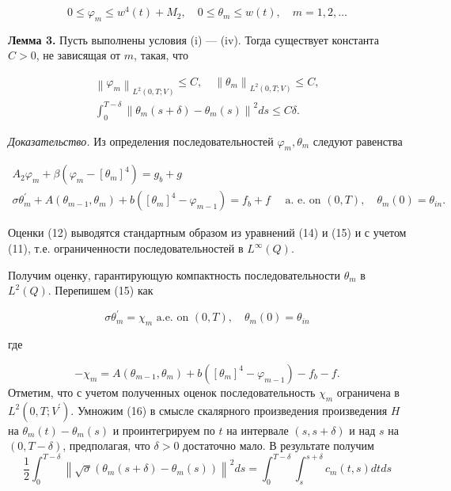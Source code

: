 \[
    0 \leq \varphi_{m} \leq w^{4}(t)+M_{2}, \quad 0 \leq \theta_{m} \leq w(t), \quad m=1,2, \ldots
\]

\textbf{Лемма 3.} Пусть выполнены условия (i) — (iv). Тогда существует константа $C>0$, не зависящая от $m$, такая, что

\[
    \begin{gathered}
        \left\|\varphi_{m}\right\|_{L^{2}(0, T ; V)} \leq C, \quad\left\|\theta_{m}\right\|_{L^{2}(0, T ; V)} \leq C, \\
        \int_{0}^{T-\delta}\left\|\theta_{m}(s+\delta)-\theta_{m}(s)\right\|^{2} d s \leq C \delta .
    \end{gathered}
\]


\textit{Доказательство.}
Из определения последовательностей $\varphi_{m}, \theta_{m}$ следуют равенства

\[
    \begin{gathered}
        A_{2} \varphi_{m}+\beta\left(\varphi_{m}-\left[\theta_{m}\right]^{4}\right)=g_{b}+g \\
        \sigma \theta_{m}^{\prime}+A\left(\theta_{m-1},
        \theta_{m}\right)+b\left(\left[\theta_{m}\right]^{4}-\varphi_{m-1}\right)=f_{b}+f
        \quad \text { a. e. on }(0, T), \quad \theta_{m}(0)=\theta_{i n}.
    \end{gathered}
\]


Оценки (12) выводятся стандартным образом из уравнений (14) и (15) и с учетом (11),
т.е. ограниченности последовательностей в $L^{\infty}(Q)$.

Получим оценку, гарантирующую компактность последовательности $\theta_{m}$ в $L^{2}(Q)$.
Перепишем (15) как

\[
    \sigma \theta_{m}^{\prime}=\chi_{m} \text { a.e. on }(0, T), \quad \theta_{m}(0)=\theta_{i n}
\]


где

\[
    -\chi_{m}=A\left(\theta_{m-1},
    \theta_{m}\right)+b\left(\left[\theta_{m}\right]^{4}
    -\varphi_{m-1}\right)-f_{b}-f.
\]
Отметим, что с учетом полученных оценок последовательность
$\chi_{m}$ ограничена в $L^{2}\left(0, T ; V^{\prime}\right)$.
Умножим (16) в смысле скалярного произведения произведения $H$ на $\theta_{m}(t)-\theta_{m}(s)$
и проинтегрируем по $t$ на интервале $(s, s+\delta)$ и
над $s$ на $(0, T-\delta)$, предполагая, что $\delta>0$ достаточно мало.
В результате получим
\[
    \frac{1}{2} \int_{0}^{T-\delta}\left\|\sqrt{\sigma}\left(\theta_{m}(s+\delta)
    - \theta_{m}(s)\right)\right\|^{2} d s
    = \int_{0}^{T-\delta} \int_{s}^{s+\delta} c_{m}(t, s) d t d s
\]


